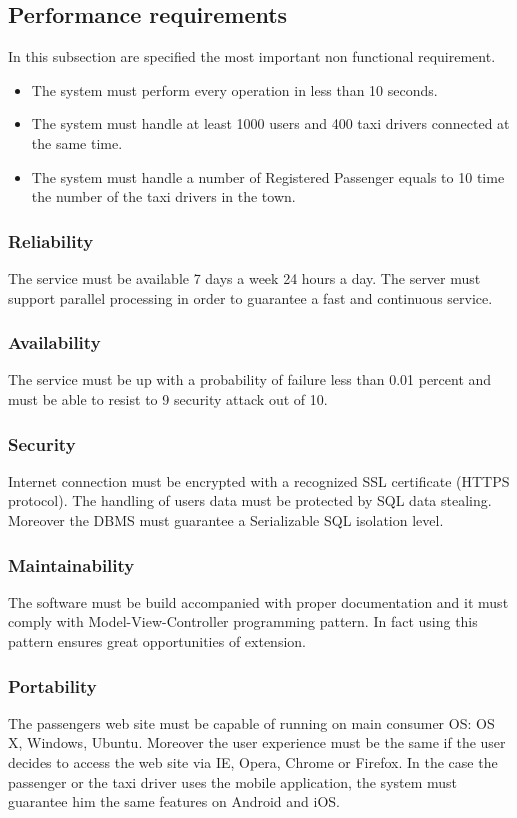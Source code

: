 \subsection{Performance requirements}
In this subsection are specified the most important non functional requirement.
\begin{itemize}
	\item The system must perform every operation in less than 10 seconds.
	\item The system must handle at least 1000 users and 400 taxi drivers connected at the same time.
	\item The system must handle a number of Registered Passenger equals to 10 time the number of the taxi drivers in the town.
\end{itemize}
%
\subsubsection{Reliability}
The service must be available 7 days a week 24 hours a day.  The server must support parallel processing in order to guarantee a fast and continuous service.
%
\subsubsection{Availability}
The service must be up with a probability of failure less than 0.01 percent and must be able to resist to 9 security attack out of 10.
%
\subsubsection{Security}
Internet connection must be encrypted with a recognized SSL certificate (HTTPS protocol). The handling of users data must be protected by SQL data stealing. Moreover the DBMS must guarantee a Serializable SQL isolation level.
%
\subsubsection{Maintainability}
The software must be build accompanied with proper documentation and it must comply with Model-View-Controller programming pattern. In fact using this pattern ensures great opportunities of extension.
%
\subsubsection{Portability}
The passengers web site must be capable of running on main consumer OS: OS X, Windows, Ubuntu.
Moreover the user experience must be the same if the user decides to access the web site via IE, Opera, Chrome or Firefox.
In the case the passenger or the taxi driver uses the mobile application, the system must guarantee him the same features on Android and iOS.